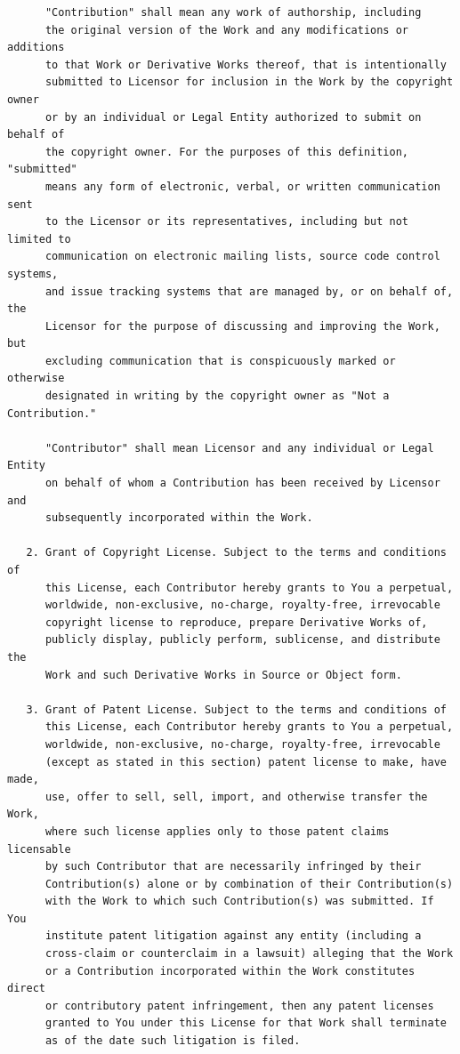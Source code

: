 \documentclass[]{report}
\begin{document}
\begin{verbatim}
      "Contribution" shall mean any work of authorship, including
      the original version of the Work and any modifications or additions
      to that Work or Derivative Works thereof, that is intentionally
      submitted to Licensor for inclusion in the Work by the copyright owner
      or by an individual or Legal Entity authorized to submit on behalf of
      the copyright owner. For the purposes of this definition, "submitted"
      means any form of electronic, verbal, or written communication sent
      to the Licensor or its representatives, including but not limited to
      communication on electronic mailing lists, source code control systems,
      and issue tracking systems that are managed by, or on behalf of, the
      Licensor for the purpose of discussing and improving the Work, but
      excluding communication that is conspicuously marked or otherwise
      designated in writing by the copyright owner as "Not a Contribution."

      "Contributor" shall mean Licensor and any individual or Legal Entity
      on behalf of whom a Contribution has been received by Licensor and
      subsequently incorporated within the Work.

   2. Grant of Copyright License. Subject to the terms and conditions of
      this License, each Contributor hereby grants to You a perpetual,
      worldwide, non-exclusive, no-charge, royalty-free, irrevocable
      copyright license to reproduce, prepare Derivative Works of,
      publicly display, publicly perform, sublicense, and distribute the
      Work and such Derivative Works in Source or Object form.

   3. Grant of Patent License. Subject to the terms and conditions of
      this License, each Contributor hereby grants to You a perpetual,
      worldwide, non-exclusive, no-charge, royalty-free, irrevocable
      (except as stated in this section) patent license to make, have made,
      use, offer to sell, sell, import, and otherwise transfer the Work,
      where such license applies only to those patent claims licensable
      by such Contributor that are necessarily infringed by their
      Contribution(s) alone or by combination of their Contribution(s)
      with the Work to which such Contribution(s) was submitted. If You
      institute patent litigation against any entity (including a
      cross-claim or counterclaim in a lawsuit) alleging that the Work
      or a Contribution incorporated within the Work constitutes direct
      or contributory patent infringement, then any patent licenses
      granted to You under this License for that Work shall terminate
      as of the date such litigation is filed.


\end{verbatim}
\end{document}

